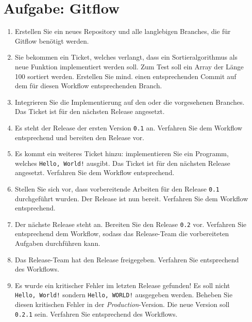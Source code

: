 
\section{Aufgabe: Gitflow}
\label{sec:task:gitflow}

\begin{enumerate}
    \item Erstellen Sie ein neues Repository und alle langlebigen Branches, die für Gitflow benötigt werden.
    
    \item Sie bekommen ein Ticket, welches verlangt, dass ein Sortieralgorithmus als neue Funktion implementiert werden soll. Zum Test soll ein Array der Länge 100 sortiert werden. Erstellen Sie mind. einen entsprechenden Commit auf dem für diesen Workflow entsprechenden Branch. \label{item:task:gitflow:sorting-algorithm}
    
    \item Integrieren Sie die Implementierung auf den oder die vorgesehenen Branches. Das Ticket ist für den nächsten Release angesetzt.
    
    \item Es steht der Release der ersten Version \verb|0.1| an. Verfahren Sie dem Workflow entsprechend und bereiten den Release vor.
    
    \item Es kommt ein weiteres Ticket hinzu: implementieren Sie ein Programm, welches \verb|Hello, World!| ausgibt. Das Ticket ist für den nächsten Release angesetzt. Verfahren Sie dem Workflow entsprechend.
    
    \item Stellen Sie sich vor, dass vorbereitende Arbeiten für den Release \verb|0.1| durchgeführt wurden. Der Release ist nun bereit. Verfahren Sie dem Workflow entsprechend.
    
    \item Der nächste Release steht an. Bereiten Sie den Release \verb|0.2| vor. Verfahren Sie entsprechend dem Workflow, sodass das Release\hyp Team die vorbereiteten Aufgaben durchführen kann.
    
    \item Das Release\hyp Team hat den Release freigegeben. Verfahren Sie entsprechend des Workflows.
    
    \item Es wurde ein kritischer Fehler im letzten Release gefunden! Es soll nicht \verb|Hello, World!| sondern \verb|Hello, WORLD!| ausgegeben werden. Beheben Sie diesen kritischen Fehler in der \emph{Production}-Version. Die neue Version soll \verb|0.2.1| sein. Verfahren Sie entsprechend des Workflows. \label{item:task:gitflow:hotfix}
\end{enumerate}

